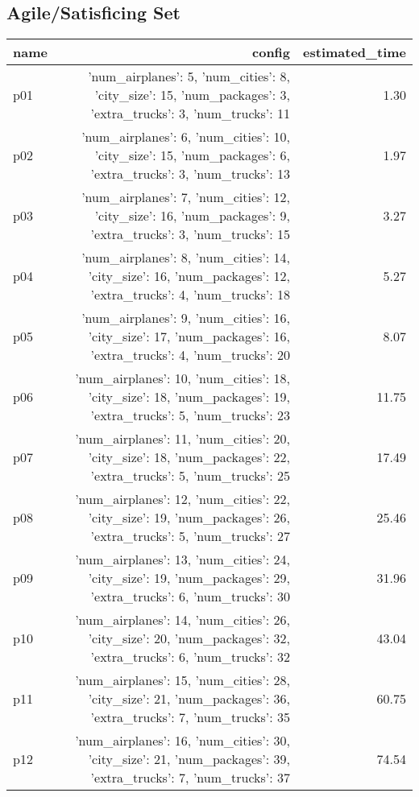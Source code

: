 \documentclass{article}
\begin{document}
                                \subsection*{Agile/Satisficing Set}
                                
                            \begin{center}
                            \scriptsize
                            \begin{tabular}{@{}l|r|r@{}}
                            name & config & estimated\_time\\\midrule
                              p01&{'num\_airplanes': 5, 'num\_cities': 8, 'city\_size': 15, 'num\_packages': 3, 'extra\_trucks': 3, 'num\_trucks': 11}&1.30\\
  p02&{'num\_airplanes': 6, 'num\_cities': 10, 'city\_size': 15, 'num\_packages': 6, 'extra\_trucks': 3, 'num\_trucks': 13}&1.97\\
  p03&{'num\_airplanes': 7, 'num\_cities': 12, 'city\_size': 16, 'num\_packages': 9, 'extra\_trucks': 3, 'num\_trucks': 15}&3.27\\
  p04&{'num\_airplanes': 8, 'num\_cities': 14, 'city\_size': 16, 'num\_packages': 12, 'extra\_trucks': 4, 'num\_trucks': 18}&5.27\\
  p05&{'num\_airplanes': 9, 'num\_cities': 16, 'city\_size': 17, 'num\_packages': 16, 'extra\_trucks': 4, 'num\_trucks': 20}&8.07\\
  p06&{'num\_airplanes': 10, 'num\_cities': 18, 'city\_size': 18, 'num\_packages': 19, 'extra\_trucks': 5, 'num\_trucks': 23}&11.75\\
  p07&{'num\_airplanes': 11, 'num\_cities': 20, 'city\_size': 18, 'num\_packages': 22, 'extra\_trucks': 5, 'num\_trucks': 25}&17.49\\
  p08&{'num\_airplanes': 12, 'num\_cities': 22, 'city\_size': 19, 'num\_packages': 26, 'extra\_trucks': 5, 'num\_trucks': 27}&25.46\\
  p09&{'num\_airplanes': 13, 'num\_cities': 24, 'city\_size': 19, 'num\_packages': 29, 'extra\_trucks': 6, 'num\_trucks': 30}&31.96\\
  p10&{'num\_airplanes': 14, 'num\_cities': 26, 'city\_size': 20, 'num\_packages': 32, 'extra\_trucks': 6, 'num\_trucks': 32}&43.04\\
  p11&{'num\_airplanes': 15, 'num\_cities': 28, 'city\_size': 21, 'num\_packages': 36, 'extra\_trucks': 7, 'num\_trucks': 35}&60.75\\
  p12&{'num\_airplanes': 16, 'num\_cities': 30, 'city\_size': 21, 'num\_packages': 39, 'extra\_trucks': 7, 'num\_trucks': 37}&74.54\\

\end{tabular}
\end{center}
\end{document}
